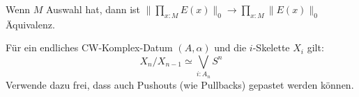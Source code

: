 \documentclass{hott-übung}
\begin{document}
\setcounter{blattnummer}{15}
\setcounter{aufgabennummer}{0}

\blatt

\aufgabe{}
Wenn \(M\) Auswahl hat, dann ist \(\|\prod_{x:M}E(x)\|_0\to \prod_{x:M}\|E(x)\|_0\) Äquivalenz.

\aufgabe{}
Für ein endliches CW-Komplex-Datum \((A,\alpha)\) und die \(i\)-Skelette \(X_i\) gilt:
\[
  X_{n}/X_{n-1}\simeq \bigvee_{i:A_n}S^n
\]
Verwende dazu frei, dass auch Pushouts (wie Pullbacks) gepastet werden können.
\end{document}
